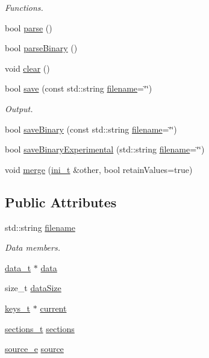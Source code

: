 \begin{DoxyCompactItemize}
\begin{DoxyCompactList}\small\item\em Functions. \end{DoxyCompactList}\item 
bool \hyperlink{class_i_n_i_a01cfaf1daca70fccef0a4db662de04c1}{parse} ()
\item 
bool \hyperlink{class_i_n_i_a86f88bfe47723393fc2460c88ab11d45}{parse\+Binary} ()
\item 
void \hyperlink{class_i_n_i_ac60a9cc0817d3435795caaebfa5e9b4e}{clear} ()
\item 
bool \hyperlink{class_i_n_i_a6b5cd2a495a3b8c8139b92ee45c74165}{save} (const std\+::string \hyperlink{class_i_n_i_af52e483d586ea3416df114e70755e96c}{filename}=\char`\"{}\char`\"{})
\begin{DoxyCompactList}\small\item\em Output. \end{DoxyCompactList}\item 
bool \hyperlink{class_i_n_i_a1bb1de72f3bdf63172740ab9c60f3f06}{save\+Binary} (const std\+::string \hyperlink{class_i_n_i_af52e483d586ea3416df114e70755e96c}{filename}=\char`\"{}\char`\"{})
\item 
bool \hyperlink{class_i_n_i_ac9ce0a9a622eb36388f7b0fb17819ad6}{save\+Binary\+Experimental} (std\+::string \hyperlink{class_i_n_i_af52e483d586ea3416df114e70755e96c}{filename}=\char`\"{}\char`\"{})
\item 
void \hyperlink{class_i_n_i_a2495473d9ccef11c6bf54af807d65ae9}{merge} (\hyperlink{class_i_n_i_a510efd26938d16fcaac1b3b8bdd47f34}{ini\+\_\+t} \&other, bool retain\+Values=true)
\end{DoxyCompactItemize}
\subsection*{Public Attributes}
\begin{DoxyCompactItemize}
\item 
std\+::string \hyperlink{class_i_n_i_af52e483d586ea3416df114e70755e96c}{filename}
\begin{DoxyCompactList}\small\item\em Data members. \end{DoxyCompactList}\item 
\hyperlink{class_i_n_i_a611e44f4d3abb28d901f7e2aaf183811}{data\+\_\+t} $\ast$ \hyperlink{class_i_n_i_a3a7884bd145b42e76290f22711536668}{data}
\item 
size\+\_\+t \hyperlink{class_i_n_i_a602d6b20ea275f3e654f1508a95ceea6}{data\+Size}
\item 
\hyperlink{class_i_n_i_a4254e881abdbf891a408cb032e0d717d}{keys\+\_\+t} $\ast$ \hyperlink{class_i_n_i_ac4b0b619f54171871f75c2a7f0fb16a7}{current}
\item 
\hyperlink{class_i_n_i_ab5fa6745b8a64763b20964a254469aa2}{sections\+\_\+t} \hyperlink{class_i_n_i_ab1825501769c4bb2cdc1d7ddd6a7be7a}{sections}
\item 
\hyperlink{class_i_n_i_a0e7d70a0276fc704cdd427c9b02f7a03}{source\+\_\+e} \hyperlink{class_i_n_i_a0a65472be1d0807d6ad380dc0b7b29d3}{source}
\end{DoxyCompactItemize}


